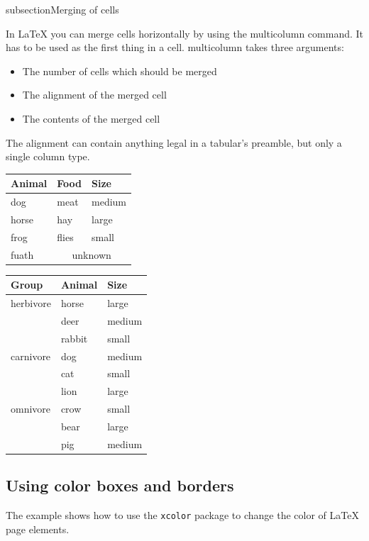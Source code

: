 \documentclass[12]{article}
\begin{document}
    subsection{Merging of cells}

    In LaTeX you can merge cells horizontally by using the multicolumn command. It has to be used as the first thing in a cell. multicolumn takes three arguments:

    \begin{itemize}
        \item The number of cells which should be merged
        \item The alignment of the merged cell
        \item The contents of the merged cell
    \end{itemize}

    The alignment can contain anything legal in a tabular’s preamble, but only a single column type.

    \begin{tabular}{lll}
      \toprule
      Animal & Food  & Size   \\
      \midrule
      dog    & meat  & medium \\
      horse  & hay   & large  \\
      frog   & flies & small  \\
      fuath  & \multicolumn{2}{c}{unknown} \\
      \bottomrule
    \end{tabular}

    \begin{tabular}{lll}
      \toprule
      Group     & Animal & Size   \\
      \midrule
      herbivore & horse  & large  \\
                & deer   & medium \\
                & rabbit & small  \\
      \addlinespace
      carnivore & dog    & medium \\
                & cat    & small  \\
                & lion   & large  \\
      \addlinespace
      omnivore  & crow   & small  \\
                & bear   & large  \\
                & pig    & medium \\
      \bottomrule
    \end{tabular}

    \subsection{Using color boxes and borders}
    The example shows how to use the \texttt{xcolor} package
    to change the color of \LaTeX{} page elements.
\end{document}
